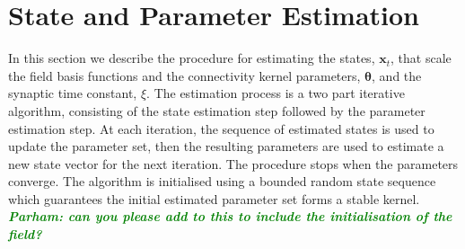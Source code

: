 \documentclass[12pt]{iopart}
\newcommand{\omg}[1]{\textsf{\emph{\textbf{\textcolor{green}{#1}}}}}
\begin{document}
% 
\section{State and Parameter Estimation}\label{StateAndParameterEstimationSection} In this section we describe the procedure for estimating the states, $\mathbf{x}_t$, that scale the field basis functions and the connectivity kernel parameters, $\boldsymbol \theta$, and the synaptic time constant, $\xi$. The estimation process is a two part iterative algorithm, consisting of the state estimation step followed by the parameter estimation step. At each iteration, the sequence of estimated states is used to update the parameter set, then the resulting parameters are used to estimate a new state vector for the next iteration. The procedure stops when the parameters converge. The algorithm is initialised using a bounded random state sequence which guarantees the initial estimated parameter set forms a stable kernel. \omg{Parham: can you please add to this to include the initialisation of the field?}
\end{document}
